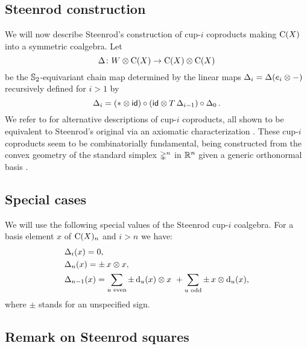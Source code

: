 %	

\subsection{Steenrod construction} \label{ss:cup-i}

We will now describe Steenrod's construction of cup-$i$ coproducts \cite[p.293]{steenrod1947products} making $\operatorname{C}(X)$ into a symmetric coalgebra.
Let
\[
\Delta \colon W \otimes \operatorname{C}(X) \to \operatorname{C}(X) \otimes \operatorname{C}(X)
\]
be the $\mathbb{S}_2$-equivariant chain map determined by the linear maps $\Delta_i = \Delta(e_i \otimes -)$ recursively defined for $i > 1$ by
\begin{equation*} \label{e:cup-i coproducts}
	\operatorname{\Delta}_i =
	(\ast \otimes \mathsf{id}) \circ (\mathsf{id} \otimes T\operatorname{\Delta}_{i-1}) \circ \operatorname{\Delta}_0.
\end{equation*}
We refer to \cite{real1996computability, gonzalez-diaz1999steenrod, mcclure2003multivariable, medina2021fast_sq} for alternative descriptions of cup-$i$ coproducts, all shown to be equivalent to Steenrod's original via an axiomatic characterization \cite{medina2022axiomatic}.
These cup-$i$ coproducts seem to be combinatorially fundamental, being constructed from the convex geometry of the standard simplex $\mathbb{\Delta}^n$ in $\mathbb{R}^n$ given a generic orthonormal basis \cite{medina2022fib_poly}.

\subsection{Special cases}

We will use the following special values of the Steenrod cup-$i$ coalgebra.
For a basis element $x$ of $\operatorname{C}(X)_n$ and $i > n$ we have:
\begin{align}
	&\Delta_i(x) = 0, \\
	&\Delta_n(x) = \pm \, x \otimes x, \\
	&\Delta_{n-1}(x) =
	\sum_{u \text{ even}} \pm \operatorname{d}_u(x) \otimes x \ +
	\sum_{u \text{ odd}} \pm \, x \otimes \operatorname{d}_u(x),
\end{align}
where $\pm$ stands for an unspecified sign.

\subsection{Remark on Steenrod squares} \label{ss:steenrod squares}

